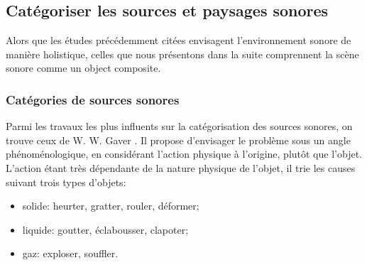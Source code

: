 \subsection{Catégoriser les sources et paysages sonores}
\label{sec:ch3_catSourceSoundScape}

Alors que les études précédemment citées envisagent l'environnement sonore de manière holistique, celles que nous présentons dans la suite comprennent la scène sonore comme un object composite.

\subsubsection{Catégories de sources sonores}
\label{sec:ch3_catSource}

Parmi les travaux les plus influents sur la catégorisation des sources sonores, on trouve ceux de W. W. Gaver \citep{gaver1993world,gaver1993we}. Il propose d'envisager le problème sous un angle phénoménologique, en considérant l'action physique à l'origine, plutôt que l'objet. L'action étant très dépendante de la nature physique de l'objet, il trie les causes suivant trois types d'objets:

\begin{itemize}
\item solide: heurter, gratter, rouler, déformer;
\item liquide: goutter, éclabousser, clapoter;
\item gaz: exploser, souffler.
\end{itemize} 

